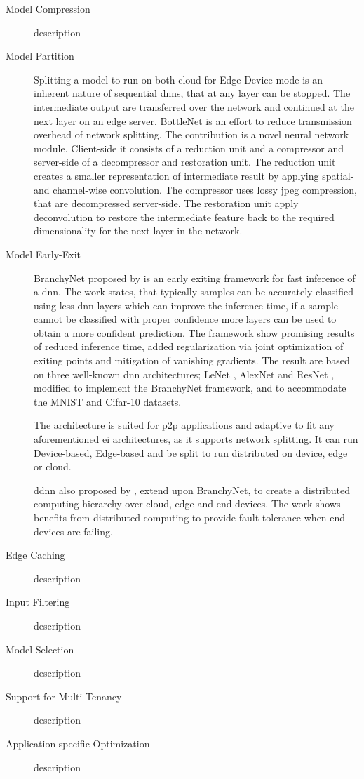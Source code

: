 \begin{description}
	\item[Model Compression] description \cite{courbariaux_binaryconnect:_2015}
	\item[Model Partition] Splitting a model to run on both cloud for Edge-Device mode is an inherent nature of sequential \gls{dnn}s, that at any layer can be stopped. The intermediate output are transferred over the network and continued at the next layer on an edge server. BottleNet \cite{eshratifar_bottlenet:_2019} is an effort to reduce transmission overhead of network splitting. The contribution is a novel neural network module. Client-side it consists of a reduction unit and a compressor and server-side of a decompressor and restoration unit. The reduction unit creates a smaller representation of intermediate result by applying spatial- and channel-wise convolution. The compressor uses lossy \gls{jpeg} compression, that are decompressed server-side. The restoration unit apply deconvolution to restore the intermediate feature back to the required dimensionality for the next layer in the network. 
	
	\item[Model Early-Exit] BranchyNet \cite{teerapittayanon_branchynet:_2016} proposed by \citeauthor{teerapittayanon_branchynet:_2016} is an early exiting framework for fast inference of a \gls{dnn}. The work states, that typically samples can be accurately classified using less \gls{dnn} layers which can improve the inference time, if a sample cannot be classified with proper confidence more layers can be used to obtain a more confident prediction. The framework show promising results of reduced inference time, added regularization via joint optimization of exiting points and mitigation of vanishing gradients. The result are based on three well-known \gls{dnn} architectures; LeNet \cite{lecun_lecun-98.pdf_1998}, AlexNet \cite{krizhevsky_imagenet_2017} and ResNet \cite{he_deep_2015}, modified to implement the BranchyNet framework, and to accommodate the MNIST \cite{lecun_mnist_2010} and Cifar-10 \cite{krizhevsky_cifar-10_nodate} datasets.  
	
	The architecture is suited for \gls{p2p} applications and adaptive to fit any aforementioned \gls{ei} architectures, as it supports network splitting. It can run Device-based, Edge-based and be split to run distributed on device, edge or cloud.
	
	\gls{ddnn} \cite{teerapittayanon_distributed_2017} also proposed by \citeauthor{teerapittayanon_distributed_2017}, extend upon BranchyNet,  to  create a distributed computing hierarchy over cloud, edge and end devices. The work shows benefits from distributed computing to provide fault tolerance when end devices are failing.
	
	\item[Edge Caching] description
	\item[Input Filtering] description
	\item[Model Selection] description
	\item[Support for Multi-Tenancy] description
	\item[Application-specific Optimization] description
\end{description}

